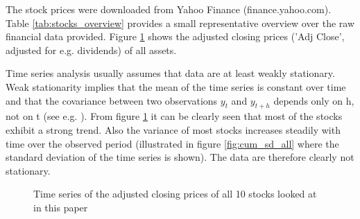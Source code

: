 The stock prices were downloaded from Yahoo Finance (finance.yahoo.com). Table \ref{tab:stocks_overview} provides a small representative overview over the raw financial data provided. Figure \ref{fig:Daily Stock Prices for all Stocks in the Data Set} shows the adjusted closing prices ('Adj Close', adjusted for e.g. dividends) of all assets. 

\begin{table}[h!]
    \centering
    \begin{adjustbox}{width = 0.95\linewidth}
    \setlength{\tabcolsep}{15pt}
    
    \end{adjustbox}
    \caption{}
    \label{tab:stocks_overview}
\end{table}{}

Time series analysis usually assumes that data are at least weakly stationary. Weak stationarity implies that the mean of the time series is constant over time and that the covariance between two observations $y_t$ and $y_{t+h}$ depends only on h, not on t (see e.g. \cite{shumway_time_2011}). From figure \ref{fig:Daily Stock Prices for all Stocks in the Data Set} it can be clearly seen that most of the stocks exhibit a strong trend. Also the variance of most stocks increases steadily with time over the observed period (illustrated in figure \ref{fig:cum_sd_all} where the standard deviation of the time series is shown). The data are therefore clearly not stationary. %

\begin{figure}[h!]
    \centering
    \begin{adjustbox}{width=.9\textwidth,center}
    
    \end{adjustbox}  
    \caption{Time series of the adjusted closing prices of all 10 stocks looked at in this paper}
    \label{fig:Daily Stock Prices for all Stocks in the Data Set}
\end{figure}{}

